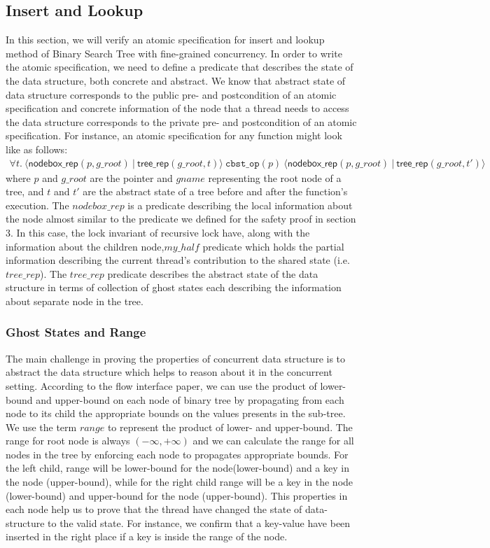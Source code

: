 \documentclass[acmsmall,screen]{acmart}\settopmatter{printfolios=true}
\begin{document}
\subsection{Insert and Lookup}
In this section, we will verify an atomic specification for insert and lookup method of Binary Search Tree with fine-grained concurrency. In order to write the atomic specification, we need to define a predicate that describes the state of the data structure, both concrete and abstract. We know that abstract state of data structure corresponds to the public pre- and postcondition of an atomic specification and concrete information of the node that a thread needs to access the data structure corresponds to the private pre- and postcondition of an atomic specification. For instance, an atomic specification for any function might look like as follows:
\begin{align*}\forall t.\ \langle \mathsf{nodebox\_rep}(p,g\_root)\ |\ \mathsf{tree\_rep}(g\_root, t)\rangle\ \texttt{cbst\_op}(p)\ \langle \mathsf{nodebox\_rep}(p,g\_root)\ |\ \mathsf{tree\_rep}(g\_root, t')\rangle
\end{align*}
where $p$ and $g\_root$ are the pointer and $gname$ representing the root node of a tree, and $t$ and $t'$ are the abstract state of a tree before and after the function's execution. The $nodebox\_rep$ is a predicate describing the local information about the node almost similar to the predicate we defined for the safety proof in section 3. In this case, the lock invariant of recursive lock have, along with the information about the children node,$my\_half$ predicate which holds the partial information describing the current thread's contribution to the shared state (i.e. $tree\_rep$). The $tree\_rep$ predicate describes the abstract state of the data structure in terms of collection of ghost states each describing the information about separate node in the tree.
\subsubsection{Ghost States and Range}
The main challenge in proving the properties of concurrent data structure is to abstract the data structure which helps to reason about it in the concurrent setting. According to the flow interface paper, we can use the product of lower-bound and upper-bound on each node of binary tree by propagating from each node to its child the appropriate bounds on the values presents in the sub-tree. We use the term $range$ to represent the product of lower- and upper-bound. The range for root node is always $(-\infty,+\infty)$ and we can calculate the range for all nodes in the tree by enforcing each node to propagates appropriate bounds. For the left child, range will be lower-bound for the node(lower-bound) and a key in the node (upper-bound), while for the right child range will be a key in the node (lower-bound) and upper-bound for the node (upper-bound). This properties in each node help us to prove that the thread have changed the state of data-structure to the valid state. For instance, we confirm that a key-value have been inserted in the right place if a key is inside the range of the node.
\end{document}
